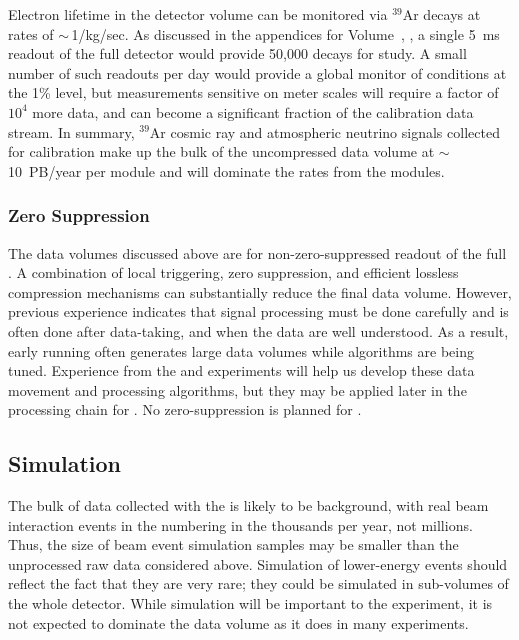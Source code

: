 Electron lifetime in the detector volume can be monitored via $^{39}$Ar decays  at rates of $\sim\,$1/kg/sec. As discussed in the appendices for 
Volume~\volnumberphysics{}, \voltitlephysics{},  a single \SI{5}{ms} readout of the full detector would provide 50,000 decays for study.  A small number of such readouts per day would provide a global monitor of conditions at the 1\% level, but measurements sensitive on meter scales will require a factor of $10^4$ more data, and can become a significant fraction of the calibration data stream. In summary, $^{39}$Ar cosmic ray and atmospheric neutrino signals collected for calibration make up the bulk of the uncompressed  data volume at $\sim\,$\SI{10}{PB/year} per module and will dominate the rates from the  modules.  

\subsubsection{Zero Suppression}
\label{sec:exec-comp-cal-zs}

The data volumes discussed above are for non-zero-suppressed readout of the full . A combination of local triggering, zero suppression, and  efficient lossless compression mechanisms can substantially reduce the final data volume. However, previous experience  indicates that signal processing must be done carefully and %
is often done after data-taking, and when the data are well understood.  As a result, early running often generates large data volumes while algorithms are being tuned. 
Experience from  the  and  experiments will help us develop these data movement and processing algorithms, but they may be applied later in the processing chain for .  No zero-suppression is planned for .



\subsection{Simulation}
\label{sec:exec-comp-dt-sim}

The bulk of data collected with the  is likely to be background, with real beam interaction events in the  numbering in the thousands per year, not millions. Thus, the size of beam event simulation samples may be %
smaller than the unprocessed raw data considered above.  %
Simulation of lower-energy events should reflect the fact that they are very rare; they could be simulated in sub-volumes of the whole detector. 
While simulation will be important to the experiment, it is not expected to dominate the data volume as it does in many experiments.  

